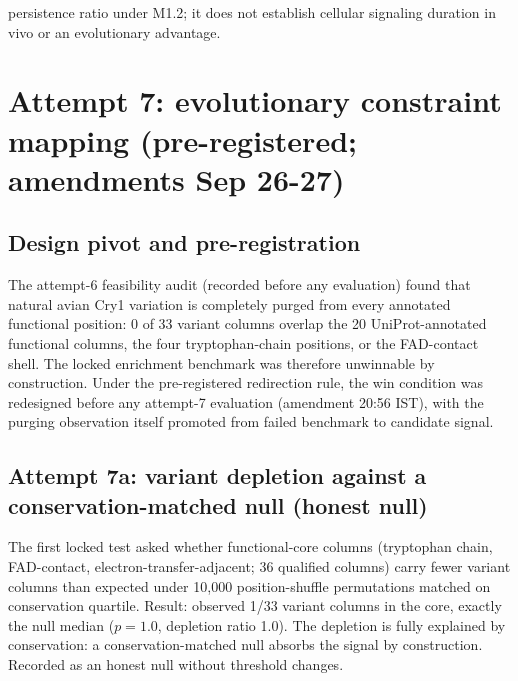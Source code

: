 \documentclass[12pt,a4paper]{article}
\begin{document}
persistence ratio under M1.2; it does not establish cellular signaling duration in vivo or an evolutionary advantage.



\section{Attempt 7: evolutionary constraint mapping (pre-registered; amendments Sep 26-27)}
\subsection{Design pivot and pre-registration}
The attempt-6 feasibility audit (recorded before any evaluation) found that natural avian Cry1 variation is completely purged from every annotated functional position: 0 of 33 variant columns overlap the 20 UniProt-annotated functional columns, the four tryptophan-chain positions, or the FAD-contact shell. The locked enrichment benchmark was therefore unwinnable by construction. Under the pre-registered redirection rule, the win condition was redesigned before any attempt-7 evaluation (amendment 20:56 IST), with the purging observation itself promoted from failed benchmark to candidate signal.

\subsection{Attempt 7a: variant depletion against a conservation-matched null (honest null)}
The first locked test asked whether functional-core columns (tryptophan chain, FAD-contact, electron-transfer-adjacent; 36 qualified columns) carry fewer variant columns than expected under 10{,}000 position-shuffle permutations matched on conservation quartile. Result: observed 1/33 variant columns in the core, exactly the null median ($p=1.0$, depletion ratio 1.0). The depletion is fully explained by conservation: a conservation-matched null absorbs the signal by construction. Recorded as an honest null without threshold changes.
\end{document}
